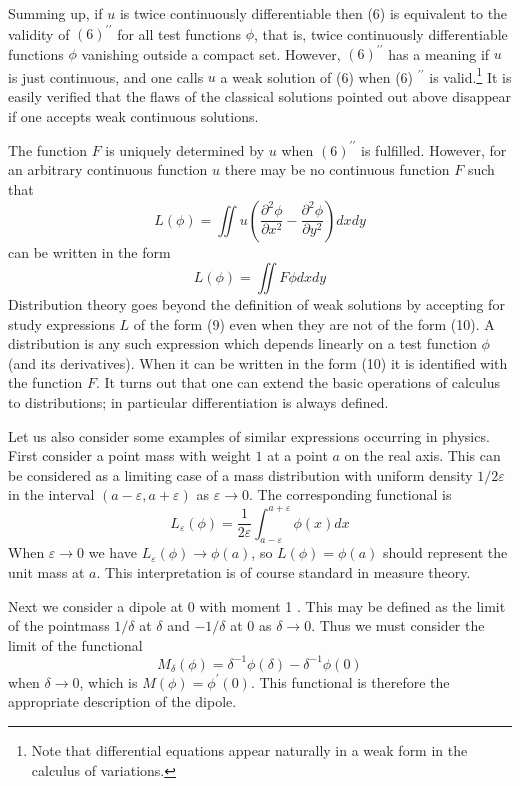Summing up, if $u$ is twice continuously differentiable then (6) is equivalent to the validity of $(6)^{\prime \prime}$ for all test functions $\phi$, that is, twice continuously differentiable functions $\phi$ vanishing outside a compact set. However, $(6)^{\prime \prime}$ has a meaning if $u$ is just continuous, and one calls $u$ a weak solution of (6) when (6) ${ }^{\prime \prime}$ is valid.\footnote{Note that differential equations appear naturally in a weak form in the calculus of variations.}
It is easily verified that the flaws of the classical solutions pointed out above disappear if one accepts weak continuous solutions.

The function $F$ is uniquely determined by $u$ when $(6)^{\prime \prime}$ is fulfilled. However, for an arbitrary continuous function $u$ there may be no continuous function $F$ such that
\begin{equation}
	L(\phi)=\iint u\left(\frac{\partial^{2} \phi}{\partial x^{2}}-\frac{\partial^{2} \phi}{\partial y^{2}}\right) d x d y
\end{equation}
can be written in the form
\begin{equation}
	L(\phi)=\iint F \phi d x d y
\end{equation}
Distribution theory goes beyond the definition of weak solutions by accepting for study expressions $L$ of the form (9) even when they are not of the form (10). A distribution is any such expression which depends linearly on a test function $\phi$ (and its derivatives). When it can be written in the form (10) it is identified with the function $F$. It turns out that one can extend the basic operations of calculus to distributions; in particular differentiation is always defined.

Let us also consider some examples of similar expressions occurring in physics. First consider a point mass with weight $1$ at a point $a$ on the real axis. This can be considered as a limiting case of a mass distribution with uniform density $1 / 2 \varepsilon$ in the interval $(a-\varepsilon, a+\varepsilon)$ as $\varepsilon \rightarrow 0$. The corresponding functional is
\[
	L_{\varepsilon}(\phi)= \frac{1}{2 \varepsilon}\int_{a-\varepsilon}^{a+\varepsilon} \phi(x) d x
\]
When $\varepsilon \rightarrow 0$ we have $L_{\varepsilon}(\phi) \rightarrow \phi(a)$, so $L(\phi)=\phi(a)$ should represent the unit mass at $a$. This interpretation is of course standard in measure theory.

Next we consider a dipole at 0 with moment 1 . This may be defined as the limit of the pointmass $1 / \delta$ at $\delta$ and $-1 / \delta$ at 0 as $\delta \rightarrow 0$. Thus we must consider the limit of the functional
\[
	M_{\delta}(\phi)=\delta^{-1} \phi(\delta)-\delta^{-1} \phi(0)
\]
when $\delta \rightarrow 0$, which is $M(\phi)=\phi^{\prime}(0)$. This functional is therefore the appropriate description of the dipole.

